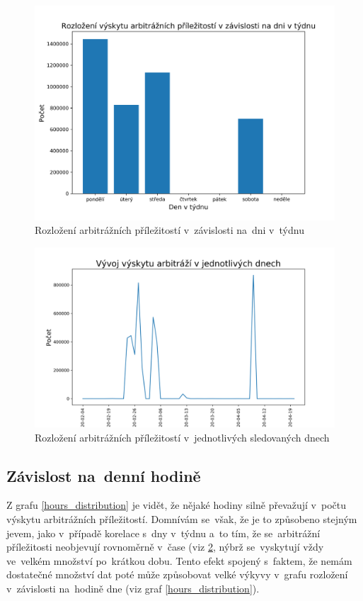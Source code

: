 \documentclass[thesis=B,czech]{FITthesis}[2019/03/21]
\begin{document}
\begin{figure}\centering
	\includegraphics[width=1\textwidth]{images/weekday_distribution.png}
	\caption{Rozložení arbitrážních příležitostí v~závislosti na~dni v~týdnu }\label{weekday_distribution}
\end{figure}
\begin{figure}\centering
	\includegraphics[width=1\textwidth]{images/occurences.png}
	\caption{Rozložení arbitrážních příležitostí v~jednotlivých sledovaných dnech}\label{occurences}
\end{figure}
\subsection{Závislost na~denní hodině}
Z grafu \ref{hours_distribution} je vidět, že nějaké hodiny silně převažují v~počtu výskytu arbitrážních příležitostí. Domnívám se~však, že je to způsobeno stejným jevem, jako v~případě korelace s~dny v~týdnu a~to tím, že se~arbitrážní příležitosti neobjevují rovnoměrně v~čase (viz \ref{occurences}, nýbrž se~vyskytují vždy ve~velkém množství po~krátkou dobu. Tento efekt spojený s~faktem, že nemám dostatečné množství dat poté může způsobovat velké výkyvy v~grafu rozložení v~závislosti na~hodině dne (viz graf \ref{hours_distribution}).
\end{document}
